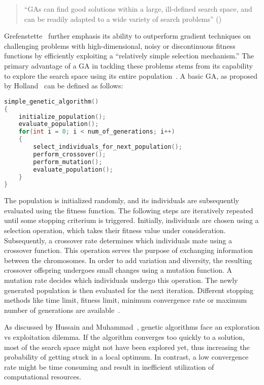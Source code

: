 \begin{quote}
	\begin{em}
		\enquote{GAs can find good solutions within a large, ill-defined search space, and can be readily adapted to a wide variety of search problems} (\cite{mills_determining_2015})
	\end{em}
\end{quote}

Grefenstette~\cite{grefenstette_optimization_1986} further emphasis its ability to outperform gradient techniques on challenging problems with high-dimensional, noisy or discontinuous fitness functions by efficiently exploiting a \enquote{relatively simple selection mechanism.} The primary advantage of a GA in tackling these problems stems from its capability to explore the search space using its entire population~\cite{hussain_trade-off_2020}. A basic GA, as proposed by Holland~\cite{holland_adaptation_1992} can be defined as follows:

\begin{lstlisting}[language=C, tabsize=4]
simple_genetic_algorithm() 
{
	initialize_population();
	evaluate_population();
	for(int i = 0; i < num_of_generations; i++) 
	{
		select_individuals_for_next_population();
		perform_crossover();
		perform_mutation();
		evaluate_population();
	}
}
\end{lstlisting}

The population is initialized randomly, and its individuals are subsequently evaluated using the fitness function. The following steps are iteratively repeated until some stopping criterium is triggered. Initially, individuals are chosen using a selection operation, which takes their fitness value under consideration. Subsequently, a crossover rate determines which individuals mate using a crossover function. This operation serves the purpose of exchanging information between the chromosomes. In order to add variation and diversity, the resulting crossover offspring undergoes small changes using a mutation function. A mutation rate decides which individuals undergo  this operation. The newly generated population is then evaluated for the next iteration. Different stopping methods like time limit, fitness limit, minimum convergence rate or maximum number of generations are available~\cite{majumdar_genetic_2015}.

As discussed by Hussain and Muhammad~\cite{hussain_trade-off_2020}, genetic algorithms face an exploration vs exploitation dilemma. If the algorithm converges too quickly to a solution, most of the search space might not have been explored yet, thus increasing the probability of getting stuck in a local optimum.
In contrast, a low convergence rate might be time consuming and result in inefficient utilization of computational resources.

